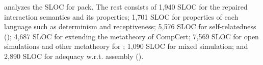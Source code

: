 








 analyzes the  SLOC for \ccm{} pack.
The rest consists of
1,940 SLOC for the repaired interaction semantics and its properties;
1,701 SLOC for properties of each language such as determinism and receptiveness;
5,576 SLOC for self-relatedness ();
4,687 SLOC for extending the metatheory of CompCert;
7,569 SLOC for open simulations and other metatheory for \ccm{};
1,090 SLOC for mixed simulation; and
2,890 SLOC for adequacy w.r.t. assembly ().


